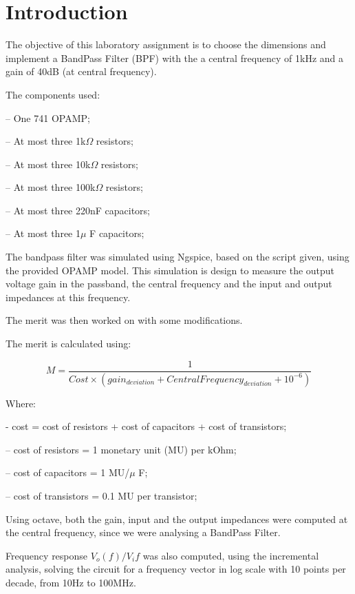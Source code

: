 \section{Introduction}
\label{sec:introduction}

The objective of this laboratory assignment is to choose the dimensions and implement a BandPass Filter (BPF) with the a central frequency of 1kHz and a gain of 40dB (at central frequency). \par
\vspace{0.5cm}
The components used:\par
– One 741 OPAMP; \par
– At most three 1k$\Omega$ resistors; \par
– At most three 10k$\Omega$  resistors; \par
– At most three 100k$\Omega$  resistors; \par
– At most three 220nF capacitors;\par
– At most three 1$\mu$ F capacitors; \par
\vspace{0.5cm}
The bandpass filter was simulated using Ngspice, based on the script given, using the provided OPAMP model. This simulation is design to measure the output voltage gain in the passband, the central frequency and the input and output impedances at this frequency. \par
The merit was then worked on with some modifications. \par
The merit is calculated using: \par
\begin{equation}
    M = \frac{1}{Cost \times (gain_{deviation} + CentralFrequency_{deviation} + 10^{-6})}
\end{equation}\par
Where:\par
- cost = cost of resistors + cost of capacitors + cost of transistors; \par
– cost of resistors = 1 monetary unit (MU) per kOhm; \par
– cost of capacitors = 1 MU/$\mu$ F; \par
– cost of transistors = 0.1 MU per transistor; \par
\vspace{0.5cm}
Using octave, both the gain, input and the output impedances were computed at the central frequency, since we were analysing a BandPass Filter. \par
Frequency response $V_{o}(f)/V_i{f}$ was also computed, using the incremental analysis, solving the circuit for a frequency vector in log scale with 10 points per decade, from 10Hz to 100MHz.\par

